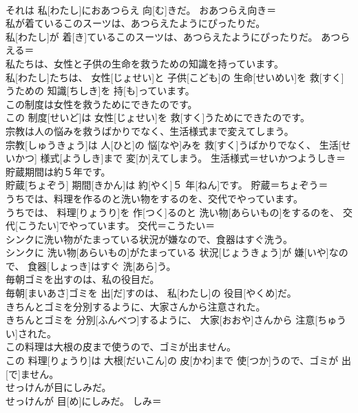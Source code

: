 \documentclass[8pt]{extreport}
\begin{document}
\begin{CJK}{UTF8}{min}
\\	それは 私[わたし]におあつらえ 向[む]きだ。	おあつらえ向き＝ 
\\	私が着ているこのスーツは、あつらえたようにぴったりだ。	
\\	私[わたし]が 着[き]ているこのスーツは、あつらえたようにぴったりだ。	あつらえる＝ 
\\	私たちは、女性と子供の生命を救うための知識を持っています。	
\\	私[わたし]たちは、 女性[じょせい]と 子供[こども]の 生命[せいめい]を 救[すく]うための 知識[ちしき]を 持[も]っています。	
\\	この制度は女性を救うためにできたのです。	
\\	この 制度[せいど]は 女性[じょせい]を 救[すく]うためにできたのです。	
\\	宗教は人の悩みを救うばかりでなく、生活様式まで変えてしまう。	
\\	宗教[しゅうきょう]は 人[ひと]の 悩[なや]みを 救[すく]うばかりでなく、 生活[せいかつ] 様式[ようしき]まで 変[か]えてしまう。	生活様式＝せいかつようしき＝ 
\\	貯蔵期間は約５年です。	
\\	貯蔵[ちょぞう] 期間[きかん]は 約[やく]５ 年[ねん]です。	貯蔵＝ちょぞう＝ 
\\	うちでは、料理を作るのと洗い物をするのを、交代でやっています。	
\\	うちでは、 料理[りょうり]を 作[つく]るのと 洗い物[あらいもの]をするのを、 交代[こうたい]でやっています。	交代＝こうたい＝ 
\\	シンクに洗い物がたまっている状況が嫌なので、食器はすぐ洗う。	
\\	シンクに 洗い物[あらいもの]がたまっている 状況[じょうきょう]が 嫌[いや]なので、 食器[しょっき]はすぐ 洗[あら]う。	
\\	毎朝ゴミを出すのは、私の役目だ。	
\\	毎朝[まいあさ]ゴミを 出[だ]すのは、 私[わたし]の 役目[やくめ]だ。	
\\	きちんとゴミを分別するように、大家さんから注意された。	
\\	きちんとゴミを 分別[ふんべつ]するように、 大家[おおや]さんから 注意[ちゅうい]された。	
\\	この料理は大根の皮まで使うので、ゴミが出ません。	
\\	この 料理[りょうり]は 大根[だいこん]の 皮[かわ]まで 使[つか]うので、ゴミが 出[で]ません。	
\\	せっけんが目にしみだ。	
\\	せっけんが 目[め]にしみだ。	しみ＝ 

\end{CJK}
\end{document}
